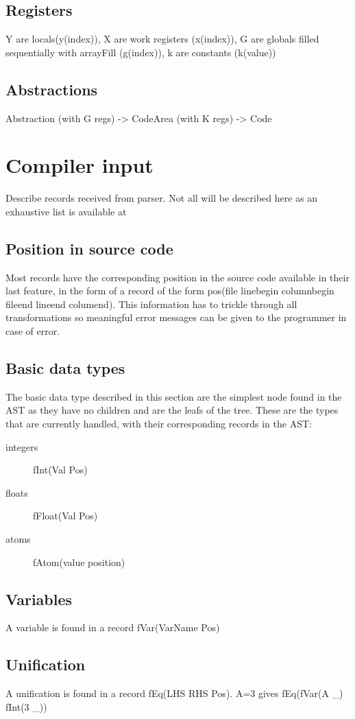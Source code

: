 \documentclass[a4paper]{memoir}
\begin{document}
\subsection{Registers}
Y are locals(y(index)), X are work registers (x(index)), G are globals filled sequentially with arrayFill (g(index)), k are constants (k(value))
\subsection{Abstractions}
Abstraction (with G regs)  -> CodeArea (with K regs) -> Code
\section{Compiler input}\label{section:compilerinput}
Describe records received from parser.
Not all will be described here as an exhaustive list is available at %
\subsection{Position in source code}
Most records have the corresponding position in the source code available in their last feature, in the form of a record of the form pos(file linebegin columnbegin fileend lineend columend). This information has to trickle through all transformations so meaningful error messages can be given to the programmer in case of error.
\subsection{Basic data types}
The basic data type described in this section are the simplest node found in the AST as they have no children and are the leafs of the tree.
These are the types that are currently handled, with their corresponding records in the AST:
\begin{description}
  \item[integers] fInt(Val Pos)
  \item[floats] fFloat(Val Pos)
  \item[atoms] fAtom(value position)
\end{description}

\subsection{Variables}
A variable is found in a record fVar(VarName Pos)

\subsection{Unification}
A unification is found in a record fEq(LHS RHS Pos).
A=3 gives fEq(fVar(A \_) fInt(3 \_))
\end{document}
